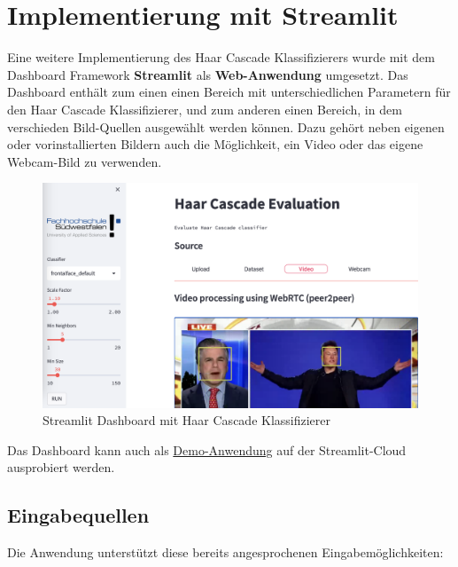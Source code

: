 \documentclass{article}
\begin{document}
\newpage

\section{Implementierung mit Streamlit}

Eine weitere Implementierung des Haar Cascade Klassifizierers wurde 
mit dem Dashboard Framework \textbf{Streamlit} als \textbf{Web-Anwendung} umgesetzt. Das Dashboard enthält
zum einen einen Bereich mit unterschiedlichen Parametern für den 
Haar Cascade Klassifizierer, und zum anderen einen Bereich, in dem 
verschieden Bild-Quellen ausgewählt werden können. Dazu gehört
neben eigenen oder vorinstallierten Bildern auch die Möglichkeit, ein Video
oder das eigene Webcam-Bild zu verwenden.

\begin{figure}[h]
	\begin{center}
 	\includegraphics[scale=0.3]{../images/streamlit/video_example.png}
 	\caption{Streamlit Dashboard mit Haar Cascade Klassifizierer}
	\end{center}
\end{figure}

Das Dashboard kann auch als \href{https://jk-fhswf-pki-a22-app-app-codcuk.streamlit.app/}{Demo-Anwendung}
auf der Streamlit-Cloud ausprobiert werden. 

\subsection{Eingabequellen}
Die Anwendung unterstützt diese bereits angesprochenen Eingabemöglichkeiten:
\end{document}

